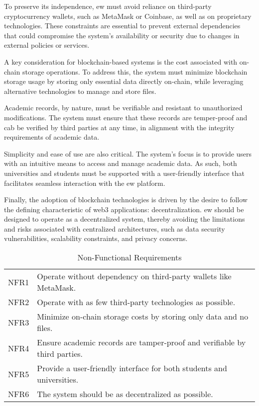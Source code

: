 To preserve its independence, \acrshort{ew} must avoid reliance on third-party cryptocurrency wallets, such as MetaMask or Coinbase, as well as on proprietary technologies. These constraints are essential to prevent external dependencies that could compromise the system’s availability or security due to changes in external policies or services.

A key consideration for blockchain-based systems is the cost associated with on-chain storage operations. To address this, the system must minimize blockchain storage usage by storing only essential data directly on-chain, while leveraging alternative technologies to manage and store files.

Academic records, by nature, must be verifiable and resistant to unauthorized modifications. The system must ensure that these records are temper-proof and cab be verified by third parties at any time, in alignment with the integrity requirements of academic data.

Simplicity and ease of use are also critical. The system's focus is to provide users with an intuitive means to access and manage academic data. As such, both universities and students must be supported with a user-friendly interface that facilitates seamless interaction with the \acrshort{ew} platform.

Finally, the adoption of blockchain technologies is driven by the desire to follow the defining characteristic of \Gls{web3} applications: decentralization. \acrshort{ew} should be designed to operate as a decentralized system, thereby avoiding the limitations and risks associated with centralized architectures, such as data security vulnerabilities, scalability constraints, and privacy concerns.

\begin{table}
\centering
\caption{Non-Functional Requirements}
\label{tab:nonFuncReq}
\begin{tabular}{|p{1.0cm}|p{11cm}|}
\hline
NFR1 & Operate without dependency on third-party wallets like MetaMask. \\
NFR2 & Operate with as few third-party technologies as possible. \\
NFR3 & Minimize on-chain storage costs by storing only data and no files. \\
NFR4 & Ensure academic records are tamper-proof and verifiable by third parties. \\
NFR5 & Provide a user-friendly interface for both students and universities. \\
NFR6 & The system should be as decentralized as possible. \\
\hline
\end{tabular}
\end{table}


